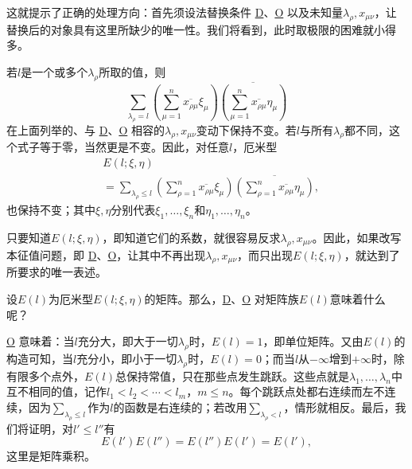 \documentclass[fontsize=13pt,twoside,openany,headings=normal,parskip=false,bookmarkpackage=false,DIV=calc]{scrbook}
\begin{document}
这就提示了正确的处理方向：首先须设法替换条件 \hyperref[eq:II.7.D]{D}、\hyperref[eq:II.7.O]{O} 以及未知量$\lambda_\rho,\allowbreak x_{\mu\nu}$，让替换后的对象具有这里所缺少的唯一性。我们将看到，此时取极限的困难就小得多。

若$l$是一个或多个$\lambda_\rho$所取的值，则
\[
\sum_{\lambda_\rho=l}
\left(\sum_{\mu=1}^n\overline{x_{\rho\mu}}\xi_\mu\right)
\overline{\left(\sum_{\mu=1}^n\overline{x_{\rho\mu}}\eta_\mu\right)}
\]
在上面列举的、与 \hyperref[eq:II.7.D]{D}、\hyperref[eq:II.7.O]{O} 相容的$\lambda_\rho,\allowbreak x_{\mu\nu}$变动下保持不变。若$l$与所有$\lambda_\rho$都不同，这个式子等于零，当然更是不变。因此，对任意$l$，厄米型
\begin{align*}
&E(l;\xi,\eta)\\
&=\sum_{\lambda_\rho\leq l}
\left(\sum_{\rho=1}^n\overline{x_{\rho\mu}}\xi_\mu\right)
\overline{\left(\sum_{\rho=1}^n\overline{x_{\rho\mu}}\eta_\mu\right)},
\end{align*}
也保持不变；其中$\xi,\allowbreak \eta$分别代表$\xi_1,\allowbreak \ldots,\allowbreak \xi_n$和$\eta_1,\allowbreak \ldots,\allowbreak \eta_n$。

\hypertarget{origpage-58}{}\label{origpage-58}只要知道$E(l;\xi,\allowbreak \eta)$，即知道它们的系数，就很容易反求$\lambda_\rho,\allowbreak x_{\mu\nu}$。因此，如果改写本征值问题，即 \hyperref[eq:II.7.D]{D}、\hyperref[eq:II.7.O]{O}，让其中不再出现$\lambda_\rho,\allowbreak x_{\mu\nu}$，而只出现$E(l;\xi,\allowbreak \eta)$，就达到了所要求的唯一表述。

设$E(l)$为厄米型$E(l;\xi,\allowbreak \eta)$的矩阵。那么，\hyperref[eq:II.7.D]{D}、\hyperref[eq:II.7.O]{O} 对矩阵族$E(l)$意味着什么呢？

\hyperref[eq:II.7.O]{O} 意味着：当$l$充分大，即大于一切$\lambda_\rho$时，$E(l)=1$，即单位矩阵。又由$E(l)$的构造可知，当$l$充分小，即小于一切$\lambda_\rho$时，$E(l)=0$；而当$l$从$-\infty$增到$+\infty$时，除有限多个点外，$E(l)$总保持常值，只在那些点发生跳跃。这些点就是$\lambda_1,\allowbreak \ldots,\allowbreak \lambda_n$中互不相同的值，记作$l_1<l_2<\cdots<l_m$，$m\leq n$。每个跳跃点处都右连续而左不连续，因为$\sum_{\lambda_\rho\leq l}$作为$l$的函数是右连续的；若改用$\sum_{\lambda_\rho<l}$，情形就相反。最后，我们将证明，对$l'\leq l''$有
\[
E(l')E(l'')=E(l'')E(l')=E(l'),
\]
这里是矩阵乘积。
\end{document}
